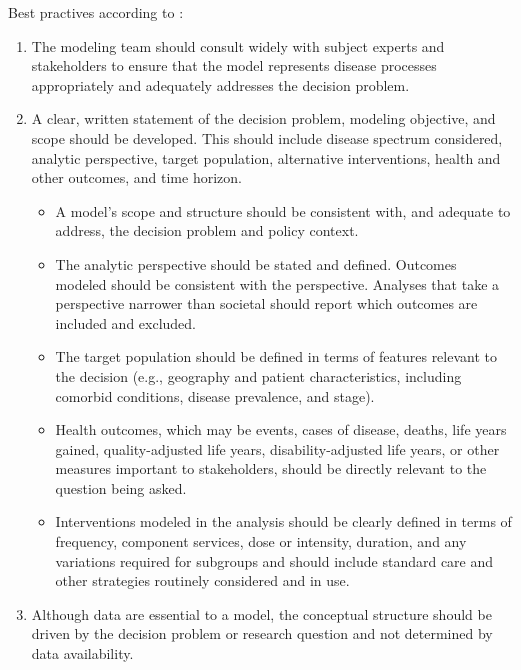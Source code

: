\documentclass[
]{book}
\providecommand{\tightlist}{%
  \setlength{\itemsep}{0pt}\setlength{\parskip}{0pt}}
\begin{document}
Best practives according to \citet{roberts2012conceptualizing}:

\begin{enumerate}
\def\labelenumi{\arabic{enumi}.}
\tightlist
\item
  The modeling team should consult widely with subject experts and stakeholders to ensure that the model represents disease processes appropriately and adequately addresses the decision problem.
\item
  A clear, written statement of the decision problem, modeling objective, and scope should be developed. This should include disease spectrum considered, analytic perspective, target population, alternative interventions, health and other outcomes, and time horizon.

  \begin{itemize}
  \tightlist
  \item
    A model's scope and structure should be consistent with, and adequate to address, the decision problem and policy context.
  \item
    The analytic perspective should be stated and defined. Outcomes modeled should be consistent with the perspective. Analyses that take a perspective narrower than societal should report which outcomes are included and excluded.
  \item
    The target population should be defined in terms of features relevant to the decision (e.g., geography and patient characteristics, including comorbid conditions, disease prevalence, and stage).
  \item
    Health outcomes, which may be events, cases of disease, deaths, life years gained, quality-adjusted life years, disability-adjusted life years, or other measures important to stakeholders, should be directly relevant to the question being asked.
  \item
    Interventions modeled in the analysis should be clearly defined in terms of frequency, component services, dose or intensity, duration, and any variations required for subgroups and should include standard care and other strategies routinely considered and in use.
  \end{itemize}
\item
  Although data are essential to a model, the conceptual structure should be driven by the decision problem or research question and not determined by data availability.


\end{enumerate}
\end{document}
